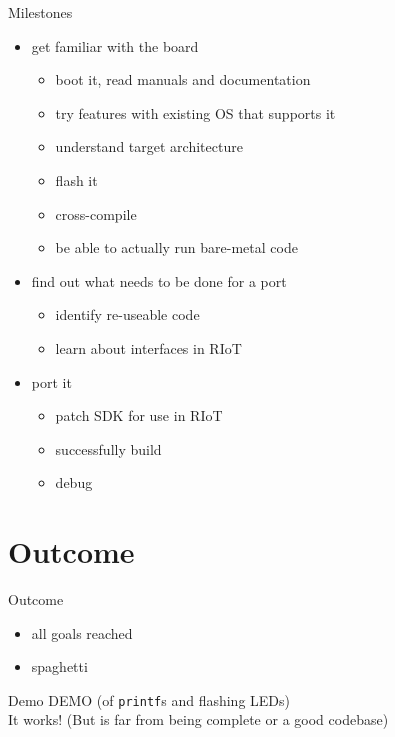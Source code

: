 \documentclass[9pt]{beamer}
\begin{document}
\begin{frame}{Milestones}
 \begin{itemize}
 \item get familiar with the board
 	\begin{itemize}
 	\item boot it, read manuals and documentation
 	\item try features with existing OS that supports it
 	\item understand target architecture
 	\item flash it
 	\item cross-compile
 	\item be able to actually run bare-metal code
 	\end{itemize}
 \item find out what needs to be done for a port
 	\begin{itemize}
 	\item identify re-useable code
 	\item learn about interfaces in RIoT
 	\end{itemize}
 \item port it
 	\begin{itemize}
 	\item patch SDK for use in RIoT
 	\item successfully build
 	\item debug
 	\end{itemize}
 \end{itemize}
\end{frame}


\section{Outcome}

\begin{frame}{Outcome}
 \begin{itemize}
  \item all goals reached
 	\item spaghetti
 \end{itemize}
\end{frame}

\begin{frame}{Demo}
DEMO (of \texttt{printf}s and flashing LEDs)
\\
It works! (But is far from being complete or a good codebase)
\end{frame}
\end{document}

